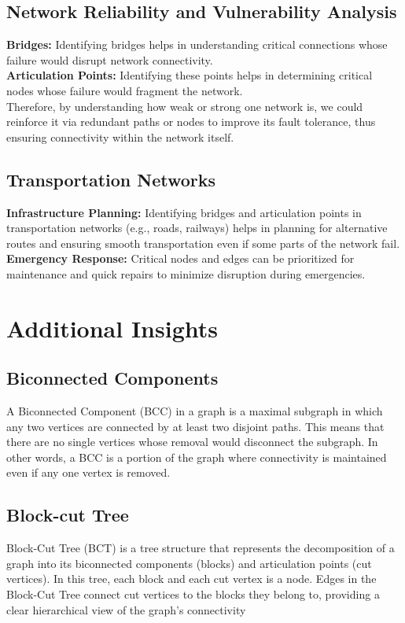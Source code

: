 \documentclass{article}
\begin{document}
\subsection{Network Reliability and Vulnerability Analysis}

\textbf{Bridges:} Identifying bridges helps in understanding critical connections whose failure would disrupt network connectivity.\\

\textbf{Articulation Points:} Identifying these points helps in determining critical nodes whose failure would fragment the network.\\

Therefore, by understanding how weak or strong one network is, we could reinforce it via redundant paths or nodes to improve its fault tolerance, thus ensuring connectivity within the network itself.

\subsection{Transportation Networks}
\textbf{Infrastructure Planning:} Identifying bridges and articulation points in transportation networks (e.g., roads, railways) helps in planning for alternative routes and ensuring smooth transportation even if some parts of the network fail.\\

\textbf{Emergency Response:} Critical nodes and edges can be prioritized for maintenance and quick repairs to minimize disruption during emergencies.\\

\section{Additional Insights}

\subsection{Biconnected Components}
A Biconnected Component (BCC) in a graph is a maximal subgraph in which any two vertices are connected by at least two disjoint paths. This means that there are no single vertices whose removal would disconnect the subgraph. In other words, a BCC is a portion of the graph where connectivity is maintained even if any one vertex is removed.

\subsection{Block-cut Tree}
 Block-Cut Tree (BCT) is a tree structure that represents the decomposition of a graph into its biconnected components (blocks) and articulation points (cut vertices). In this tree, each block and each cut vertex is a node. Edges in the Block-Cut Tree connect cut vertices to the blocks they belong to, providing a clear hierarchical view of the graph's connectivity
\end{document}
